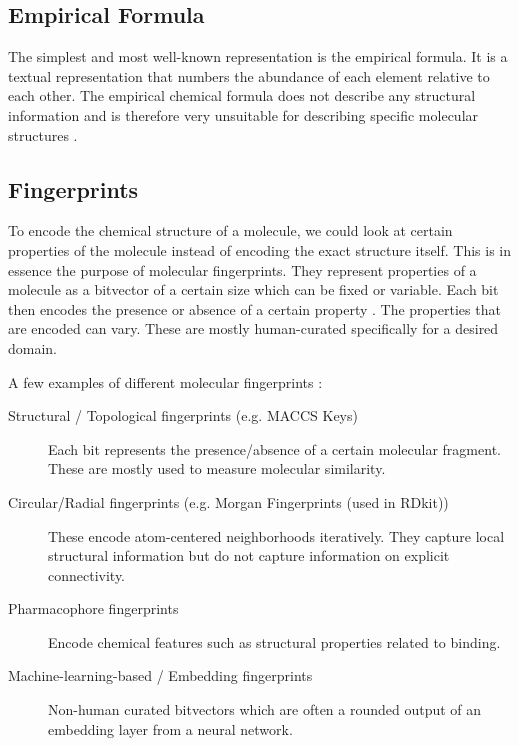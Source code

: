 \subsection{Empirical Formula}

The simplest and most well-known representation is the empirical formula. It is a textual representation that numbers the abundance of each element relative to each other. The empirical chemical formula does not describe any structural information and is therefore very unsuitable for describing specific molecular structures \cite{hartshorn2015brief}.

\subsection{Fingerprints}

To encode the chemical structure of a molecule, we could look at certain properties of the molecule instead of encoding the exact structure itself. This is in essence the purpose of molecular fingerprints. They represent properties of a molecule as a bitvector of a certain size which can be fixed or variable. Each bit then encodes the presence or absence of a certain property \cite{kuwahara2021analysis}. The properties that are encoded can vary. These are mostly human-curated specifically for a desired domain.

A few examples of different molecular fingerprints \cite{wigh2022review, kuwahara2021analysis, pharmacorefingerprints}:
\begin{description}
   \item[Structural / Topological fingerprints (e.g. MACCS Keys)]{Each bit represents the presence/absence of a certain molecular fragment. These are mostly used to measure molecular similarity.}
   \item[Circular/Radial fingerprints (e.g. Morgan Fingerprints (used in RDkit))]{These encode atom-centered neighborhoods iteratively. They capture local structural information but do not capture information on explicit connectivity.}
   \item[Pharmacophore fingerprints]{Encode chemical features such as structural properties related to binding.} 
   \item[Machine-learning-based / Embedding fingerprints]{Non-human curated bitvectors which are often a rounded output of an embedding layer from a neural network.}
\end{description}

